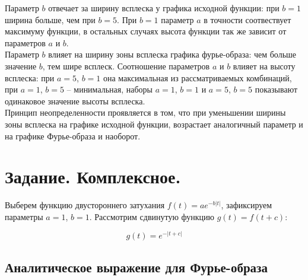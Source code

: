 \documentclass[a5paper, 10pt]{article}
\theoremstyle{definition}
\theoremstyle{plain}
\theoremstyle{remark}
\begin{document}
Параметр $b$ отвечает за ширину всплеска у графика исходной функции: при $b = 1$ ширина больше, чем при $b=5$. При $b=1$ параметр $a$ в точности соотвествует максимуму функции, в остальных случаях высота функции так же зависит от параметров $a$ и $b$.\\

Параметр $b$ влияет на ширину зоны всплеска графика фурье-образа: чем больше значение $b$, тем шире всплеск. Соотношение параметров $a$ и $b$ влияет на высоту всплеска: при $a=5$, $b=1$ она максимальная из рассматриваемых комбинаций, при $a=1$, $b=5$ -- минимальная, наборы $a=1$, $b=1$ и $a=5$, $b=5$ показывают одинаковое значение высоты всплеска.\\

Принцип неопределенности проявляется в том, что при уменьшении ширины зоны всплеска на графике исходной функции, возрастает аналогичный параметр и на графике Фурье-образа и наоборот.\\



\newpage
\section{Задание. Комплексное.}
Выберем функцию двустороннего затухания $f(t) =  a e^{-b|t|}$, зафиксируем параметры $a=1$, $b=1$. Рассмотрим сдвинутую функцию $g(t) = f(t+c)$:

\begin{equation}
g(t) = e^{-|t+c|}
\end{equation}

\subsection{Аналитическое выражение для Фурье-образа}
\end{document}
